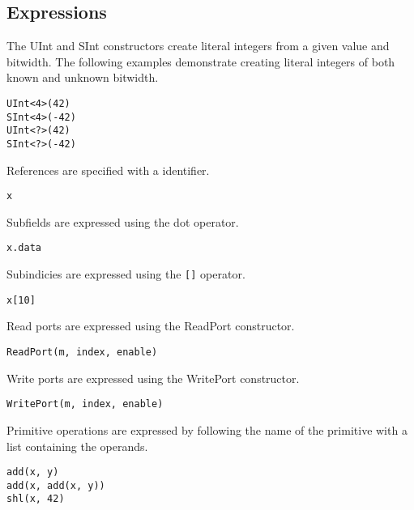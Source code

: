 \documentclass[12pt]{article}
\begin{document}
\subsection*{Expressions}

The UInt and SInt constructors create literal integers from a given value and bitwidth.
The following examples demonstrate creating literal integers of both known and unknown bitwidth.
\begin{verbatim}
UInt<4>(42)
SInt<4>(-42)
UInt<?>(42)
SInt<?>(-42)
\end{verbatim}

References are specified with a identifier.
\begin{verbatim}
x
\end{verbatim}

Subfields are expressed using the dot operator.
\begin{verbatim}
x.data
\end{verbatim}

Subindicies are expressed using the \verb|[]| operator.
\begin{verbatim}
x[10]
\end{verbatim}

Read ports are expressed using the ReadPort constructor.
\begin{verbatim}
ReadPort(m, index, enable)
\end{verbatim}

Write ports are expressed using the WritePort constructor.
\begin{verbatim}
WritePort(m, index, enable)
\end{verbatim}

Primitive operations are expressed by following the name of the primitive with a list containing the operands. 
\begin{verbatim}
add(x, y)
add(x, add(x, y))
shl(x, 42)
\end{verbatim}
\end{document}
